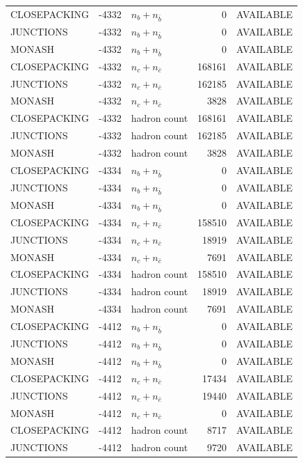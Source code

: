 \begin{landscape}
\begin{longtable}{@{}lrlrl@{}}
CLOSEPACKING & -4332 & $n_b+n_{\bar b}$ & \num{0} & AVAILABLE \\
JUNCTIONS & -4332 & $n_b+n_{\bar b}$ & \num{0} & AVAILABLE \\
MONASH & -4332 & $n_b+n_{\bar b}$ & \num{0} & AVAILABLE \\
CLOSEPACKING & -4332 & $n_c+n_{\bar c}$ & \num{168161} & AVAILABLE \\
JUNCTIONS & -4332 & $n_c+n_{\bar c}$ & \num{162185} & AVAILABLE \\
MONASH & -4332 & $n_c+n_{\bar c}$ & \num{3828} & AVAILABLE \\
CLOSEPACKING & -4332 & hadron count & \num{168161} & AVAILABLE \\
JUNCTIONS & -4332 & hadron count & \num{162185} & AVAILABLE \\
MONASH & -4332 & hadron count & \num{3828} & AVAILABLE \\
CLOSEPACKING & -4334 & $n_b+n_{\bar b}$ & \num{0} & AVAILABLE \\
JUNCTIONS & -4334 & $n_b+n_{\bar b}$ & \num{0} & AVAILABLE \\
MONASH & -4334 & $n_b+n_{\bar b}$ & \num{0} & AVAILABLE \\
CLOSEPACKING & -4334 & $n_c+n_{\bar c}$ & \num{158510} & AVAILABLE \\
JUNCTIONS & -4334 & $n_c+n_{\bar c}$ & \num{18919} & AVAILABLE \\
MONASH & -4334 & $n_c+n_{\bar c}$ & \num{7691} & AVAILABLE \\
CLOSEPACKING & -4334 & hadron count & \num{158510} & AVAILABLE \\
JUNCTIONS & -4334 & hadron count & \num{18919} & AVAILABLE \\
MONASH & -4334 & hadron count & \num{7691} & AVAILABLE \\
CLOSEPACKING & -4412 & $n_b+n_{\bar b}$ & \num{0} & AVAILABLE \\
JUNCTIONS & -4412 & $n_b+n_{\bar b}$ & \num{0} & AVAILABLE \\
MONASH & -4412 & $n_b+n_{\bar b}$ & \num{0} & AVAILABLE \\
CLOSEPACKING & -4412 & $n_c+n_{\bar c}$ & \num{17434} & AVAILABLE \\
JUNCTIONS & -4412 & $n_c+n_{\bar c}$ & \num{19440} & AVAILABLE \\
MONASH & -4412 & $n_c+n_{\bar c}$ & \num{0} & AVAILABLE \\
CLOSEPACKING & -4412 & hadron count & \num{8717} & AVAILABLE \\
JUNCTIONS & -4412 & hadron count & \num{9720} & AVAILABLE \\

\end{longtable}
\end{landscape}
